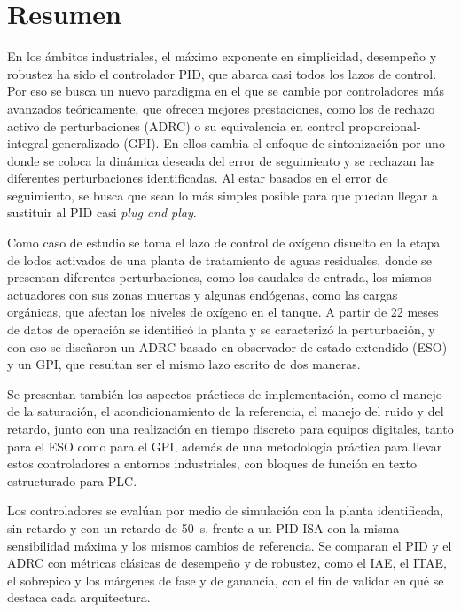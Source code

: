 \chapter*{Resumen}

En los ámbitos industriales, el máximo exponente en simplicidad, desempeño y robustez ha sido el
controlador PID, que abarca casi todos los lazos de control. Por eso se busca un nuevo paradigma en
el que se cambie por controladores más avanzados teóricamente, que ofrecen mejores prestaciones, como
los de rechazo activo de perturbaciones (ADRC) o su equivalencia en control
proporcional-integral generalizado (GPI). En ellos cambia el enfoque de sintonización por uno donde
se coloca la dinámica deseada del error de seguimiento y se rechazan las diferentes perturbaciones
identificadas. Al estar basados en el error de seguimiento, se busca que sean lo más simples posible
para que puedan llegar a sustituir al PID casi \emph{plug and play}.

Como caso de estudio se toma el lazo de control de oxígeno disuelto en la etapa de lodos activados
de una planta de tratamiento de aguas residuales, donde se presentan diferentes perturbaciones, como
los caudales de entrada, los mismos actuadores con sus zonas muertas y algunas endógenas, como las
cargas orgánicas, que afectan los niveles de oxígeno en el tanque. A partir de 22 meses de datos de
operación se identificó la planta y se caracterizó la perturbación, y con eso se diseñaron un ADRC
basado en observador de estado extendido (ESO) y un GPI, que resultan ser el mismo lazo escrito de
dos maneras.

Se presentan también los aspectos prácticos de implementación, como el manejo de la saturación, el
acondicionamiento de la referencia, el manejo del ruido y del retardo, junto con una realización en
tiempo discreto para equipos digitales, tanto para el ESO como para el GPI, además de una metodología
práctica para llevar estos controladores a entornos industriales, con bloques de función en texto
estructurado para PLC.

Los controladores se evalúan por medio de simulación con la planta identificada, sin retardo y con un
retardo de 50~s, frente a un PID ISA con la misma sensibilidad máxima y los mismos cambios de
referencia. Se comparan el PID y el ADRC con métricas clásicas de desempeño y de robustez, como el IAE,
el ITAE, el sobrepico y los márgenes de fase y de ganancia, con el fin de validar en qué se destaca
cada arquitectura.

